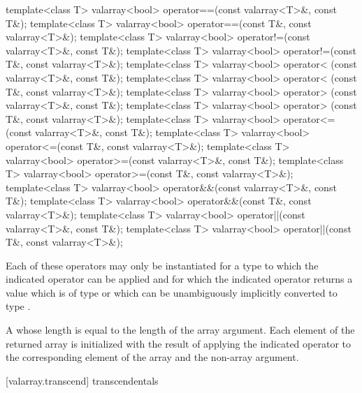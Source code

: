 %
%
%
%
%
%
%
%
\begin{itemdecl}
template<class T> valarray<bool> operator==(const valarray<T>&, const T&);
template<class T> valarray<bool> operator==(const T&, const valarray<T>&);
template<class T> valarray<bool> operator!=(const valarray<T>&, const T&);
template<class T> valarray<bool> operator!=(const T&, const valarray<T>&);
template<class T> valarray<bool> operator< (const valarray<T>&, const T&);
template<class T> valarray<bool> operator< (const T&, const valarray<T>&);
template<class T> valarray<bool> operator> (const valarray<T>&, const T&);
template<class T> valarray<bool> operator> (const T&, const valarray<T>&);
template<class T> valarray<bool> operator<=(const valarray<T>&, const T&);
template<class T> valarray<bool> operator<=(const T&, const valarray<T>&);
template<class T> valarray<bool> operator>=(const valarray<T>&, const T&);
template<class T> valarray<bool> operator>=(const T&, const valarray<T>&);
template<class T> valarray<bool> operator&&(const valarray<T>&, const T&);
template<class T> valarray<bool> operator&&(const T&, const valarray<T>&);
template<class T> valarray<bool> operator||(const valarray<T>&, const T&);
template<class T> valarray<bool> operator||(const T&, const valarray<T>&);
\end{itemdecl}

\begin{itemdescr}
\pnum
\requires
Each of these operators may only be instantiated for a type 
to which the indicated operator can be applied and for which
the indicated operator returns a value which is of type 
or which can be unambiguously implicitly converted to type .

\pnum
\returns
A  whose
length is equal to the length of the array argument.
Each element
of the returned array is initialized with the result of applying the
indicated operator to the corresponding element of the array and the non-array argument.
\end{itemdescr}

[valarray.transcend]{ transcendentals}

